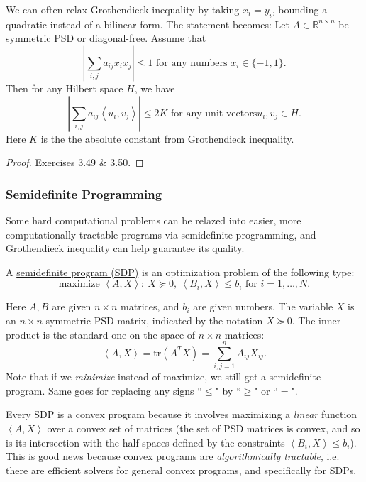 \begin{remark}
\label{rmk:3.5.3}
We can often relax Grothendieck inequality by taking $x_i = y_i$, bounding a quadratic instead of a bilinear 
form. The statement becomes: Let $A \in \mathbb{R}^{n \times n}$ be symmetric PSD or diagonal-free. Assume that 
\[ \left| \sum_{i, j}^{} a_{ij}x_ix_j \right| \leq 1 \text{ for any numbers } x_i \in \{-1, 1\}. \]
Then for any Hilbert space $H$, we have 
\[ \left| \sum_{i, j}^{} a_{ij}\left\langle u_i, v_j \right\rangle \right| \leq 2K \text{ for any unit vectors} 
u_i, v_j \in H. \]
Here $K$ is the the absolute constant from Grothendieck inequality.
\end{remark}

\begin{proof}
Exercises 3.49 \& 3.50.
\end{proof}


\subsubsection{Semidefinite Programming}
Some hard computational problems can be relazed into easier, more computationally tractable programs via 
semidefinite programming, and Grothendieck inequality can help guarantee its quality.

\begin{definition}[]
\label{def:3.5.4}
A \underline{semidefinite program (SDP)} is an optimization problem of the following type: 
\[ \text{maximize } \left\langle A, X \right\rangle: \ X \succeq 0, \ 
\left\langle B_i, X \right\rangle \leq b_i \text{ for } i = 1, \dots, N. \]
\end{definition}
Here $A, B$ are given $n \times n$ matrices, and $b_i$ are given numbers. The variable $X$ is an $n \times n$ 
symmetric PSD matrix, indicated by the notation $X \succeq 0$. The inner product is the standard one on the 
space of $n \times n$ matrices: 
\[ \left\langle A, X \right\rangle = \mathrm{tr}(A^T X) = \sum_{i, j = 1}^{n}A_{ij}X_{ij}. \]
Note that if we \textit{minimize} instead of maximize, we still get a semidefinite program. Same goes for 
replacing any signs ``$\leq$" by ``$\geq$" or ``$=$".

\begin{remark}
\label{rmk:3.5.5}
Every SDP is a convex program because it involves maximizing a \textit{linear} function $\left\langle A, X 
\right\rangle$ over a convex set of matrices (the set of PSD matrices is convex, and so is its intersection 
with the half-spaces defined by the constraints $\left\langle B_i, X \right\rangle \leq b_i$). This is good news 
because convex programs are \textit{algorithmically tractable}, i.e. there are efficient solvers for general 
convex programs, and specifically for SDPs.
\end{remark}

